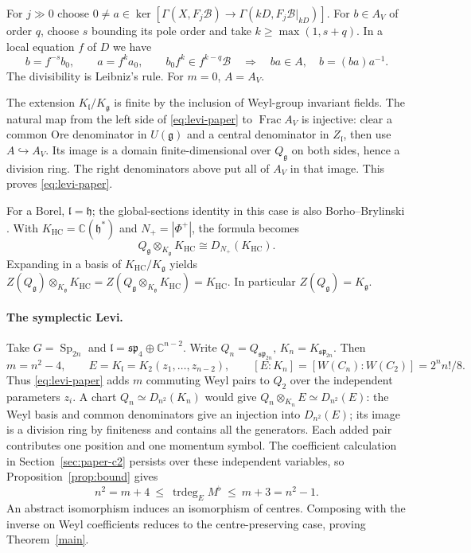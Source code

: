 \documentclass[11pt,a4paper]{article}
\renewcommand{\le}{\leqslant}\renewcommand{\ge}{\geqslant}
\newcommand{\C}{\mathbb C}
\newcommand{\Frac}{\operatorname{Frac}}
\newcommand{\trdeg}{\operatorname{trdeg}}
\theoremstyle{definition}
\begin{document}
For \(j\gg0\) choose \(0\ne a\in\ker[\Gamma(X,F_j\mathcal B)\to
\Gamma(kD,F_j\mathcal B|_{kD})]\).
For \(b\in A_V\) of order \(q\), choose \(s\) bounding its pole order and
take \(k\ge\max(1,s+q)\). In a local equation \(f\) of \(D\) we have
\[
 b=f^{-s}b_0,\qquad a=f^ka_0,\qquad
 b_0 f^k\in f^{k-q}\mathcal B
 \quad\Longrightarrow\quad ba\in A,\quad b=(ba)a^{-1}.
\]
The divisibility is Leibniz's rule. For \(m=0\), \(A=A_V\).

The extension \(K_{\mathfrak l}/K_{\mathfrak g}\) is finite by the
inclusion of Weyl-group invariant fields. The natural map from the left
side of \eqref{eq:levi-paper} to \(\Frac A_V\) is injective: clear a common
Ore denominator in \(U(\mathfrak g)\) and a central denominator in
\(Z_{\mathfrak l}\), then use \(A\hookrightarrow A_V\).
Its image is a domain finite-dimensional over \(Q_{\mathfrak g}\) on
both sides, hence a division ring. The right denominators above put all
of \(A_V\) in that image. This proves \eqref{eq:levi-paper}.

For a Borel, \(\mathfrak l=\mathfrak h\); the global-sections identity in this case is also Borho--Brylinski \cite[Prop.~8]{BB}. With
\(K_{\mathrm{HC}}=\C(\mathfrak h^*)\) and \(N_+=|\Phi^+|\), the formula becomes
\[
 Q_{\mathfrak g}\otimes_{K_{\mathfrak g}}K_{\mathrm{HC}}
 \cong D_{N_+}(K_{\mathrm{HC}}).
\]
Expanding in a basis of \(K_{\mathrm{HC}}/K_{\mathfrak g}\) yields
\(Z(Q_{\mathfrak g})\otimes_{K_{\mathfrak g}}K_{\mathrm{HC}}
 = Z(Q_{\mathfrak g}\otimes_{K_{\mathfrak g}}K_{\mathrm{HC}})=K_{\mathrm{HC}}\).
In particular \(Z(Q_{\mathfrak g})=K_{\mathfrak g}\).

\paragraph{The symplectic Levi.}
Take \(G=\operatorname{Sp}_{2n}\) and
\(\mathfrak l=\mathfrak{sp}_4\oplus\C^{n-2}\). Write
\(Q_n=Q_{\mathfrak{sp}_{2n}},\,K_n=K_{\mathfrak{sp}_{2n}}\). Then
\[
 m=n^2-4,\qquad E=K_{\mathfrak l}=K_2(z_1,\ldots,z_{n-2}),\qquad
 [E:K_n]=[W(C_n):W(C_2)]=2^n n!/8 .
\]
Thus \eqref{eq:levi-paper} adds \(m\) commuting Weyl pairs to \(Q_2\) over
the independent parameters \(z_i\). A chart \(Q_n\simeq D_{n^2}(K_n)\)
would give \(Q_n\otimes_{K_n}E\simeq D_{n^2}(E)\):
the Weyl basis and common denominators give an injection into \(D_{n^2}(E)\);
its image is a division ring by finiteness and contains all the generators.
Each added pair contributes one position and one momentum symbol.
The coefficient calculation in Section~\ref{sec:paper-c2} persists over
these independent variables, so Proposition~\ref{prop:bound} gives
\[
  n^2=m+4\ \le\ \trdeg_E M^\flat\ \le\ m+3=n^2-1.
\]
An abstract isomorphism induces an isomorphism of centres. Composing with the inverse on Weyl coefficients reduces to the centre-preserving case, proving Theorem~\ref{main}.
\end{document}
